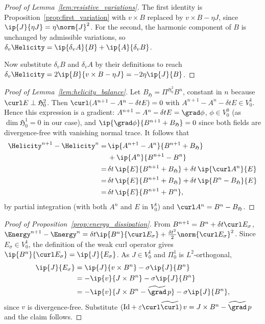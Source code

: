 \documentclass[%
 reprint,
 superscriptaddress,
 amsmath,amssymb,
 aps, nofootinbib, floatfix]{revtex4-2}
\begin{document}
\begin{proof}[Proof of Lemma~\ref{lem:resistive_variations}]
    The first identity is Proposition~\ref{prop:first_variation} with $v \times B$ replaced by $v \times B - \eta J$, since $\ip{J}{\eta J} = \eta \norm{J}^2$. For the second, the harmonic component of $B$ is unchanged by admissible variations, so $\delta_v \Helicity = \ip{\delta_v A}{B} + \ip{A}{\delta_v B}$.
    
    Now substitute $\delta_v B$ and $\delta_v A$ by their definitions to reach $\delta_v \Helicity = 2 \ip{B}{v \times B - \eta J} = - 2 \eta \ip{J}{B}$.
\end{proof}

\begin{proof}[Proof of Lemma~\ref{lem:helicity_balance}]
    Let $B_{\mathfrak H} = \Pi^{\mathfrak H^2_0} B^n$,  constant in $n$ because $\curl E \perp \mathfrak H^2_0$. Then $\curl (A^{n+1} - A^n - \delta t E) = 0$ with $A^{n+1} - A^n - \delta t E \in V^1_0$. Hence this expression is a gradient: $A^{n+1} - A^n - \delta t E = \grad \phi$, $\phi \in V^0_0$ (as $\dim \mathfrak H^1_0 = 0$ in our case), and $\ip{\grad \phi}{B^{n+1} + B_{\mathfrak H}} = 0$ since both fields are divergence-free with vanishing normal trace. It follows that
    \begin{align}
    \notag
        \Helicity^{n+1} - \Helicity^{n}
        =\, &\ip{A^{n+1} - A^n}{B^{n+1} + B_{\mathfrak H}} \\ &+ \ip{A^n}{B^{n+1} - B^n} \notag \\
        =\, &\delta t \, \ip{E}{B^{n+1} + B_{\mathfrak H}} + \delta t \, \ip{\curl A^n}{E} \notag \\
        =\, &\delta t \, \ip{E}{B^{n+1} + B_{\mathfrak H}} + \delta t \, \ip{B^n - B_{\mathfrak H}}{E} \notag \\
        =\, &\delta t \, \ip{E}{B^{n+1} + B^n},
    \end{align}
    by partial integration (with both $A^n$ and $E$ in $V^1_0$) and $\curl A^n = B^n - B_{\mathfrak H}$.
\end{proof}

\begin{proof}[Proof of Proposition~\ref{prop:energy_dissipation}]
        From $B^{n+1} = B^n + \delta t \curl E_\sigma$, $\Energy^{n+1} - \Energy^n = \delta t \ip{B^n}{\curl E_\sigma} + \frac{\delta t^2}{2} \norm{\curl E_\sigma}^2$. Since $E_\sigma \in V^1_0$, the definition of the weak curl operator gives $\ip{B^n}{\curl E_\sigma} = \ip{J}{E_\sigma}$. As $J \in V^1_0$ and $\Pi^1_0$ is $L^2$-orthogonal,
    \begin{align}
        \ip{J}{E_\sigma} &= \ip{J}{v \times B^n} - \sigma \ip{J}{B^n} \notag \\
        &= - \ip{v}{J \times B^n} - \sigma \ip{J}{B^n} \notag \\
        &= - \ip{v}{J \times B^n - \widetilde{\grad} \, p} - \sigma \ip{J}{B^n},
    \end{align}
    since $v$ is divergence-free. Substitute $(\mathrm{Id} + \varepsilon \curl \widetilde{\curl}) \, v = J \times B^n - \widetilde{\grad} \, p$ and the claim follows.
\end{proof}
\end{document}
